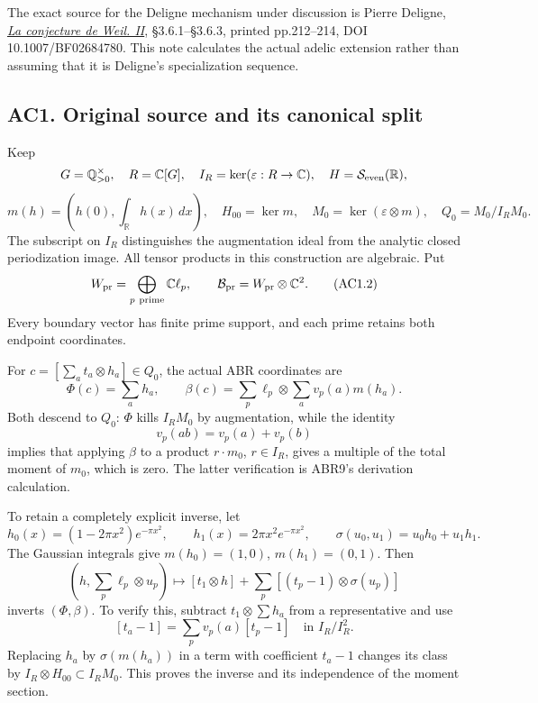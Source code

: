 The exact source for the Deligne mechanism under discussion is Pierre
Deligne,
\href{https://www.numdam.org/item/PMIHES_1980__52__137_0/}{\emph{La
conjecture de Weil. II}}, §3.6.1--§3.6.3, printed pp.212--214, DOI
10.1007/BF02684780. This note calculates the actual adelic extension
rather than assuming that it is Deligne's specialization sequence.

\subsection{AC1. Original source and its canonical
split}\label{ac1.-original-source-and-its-canonical-split}

Keep \[
 G=\mathbb Q_{>0}^{\times},\quad R=\mathbb C[G],\quad
 I_R=\ker(\varepsilon:R\to\mathbb C),\quad
 H=\mathcal S_{\rm even}(\mathbb R),
\] \[
 m(h)=\left(h(0),\int_{\mathbb R}h(x)\,dx\right),\quad
 H_{00}=\ker m,\quad M_0=\ker(\varepsilon\otimes m),
 \quad Q_0=M_0/I_RM_0 .
\tag{AC1.1}
\] The subscript on \(I_R\) distinguishes the augmentation ideal from
the analytic closed periodization image. All tensor products in this
construction are algebraic. Put \[
 W_{\rm pr}=\bigoplus_{p\ {\rm prime}}\mathbb C\ell_p,\qquad
 \mathcal B_{\rm pr}=W_{\rm pr}\otimes\mathbb C^2.
\tag{AC1.2}
\] Every boundary vector has finite prime support, and each prime
retains both endpoint coordinates.

For \(c=[\sum_at_a\otimes h_a]\in Q_0\), the actual ABR coordinates are
\[
 \Phi(c)=\sum_a h_a,\qquad
 \beta(c)=\sum_p\ell_p\otimes\sum_a v_p(a)m(h_a).
\tag{AC1.3}
\] Both descend to \(Q_0\): \(\Phi\) kills \(I_RM_0\) by augmentation,
while the identity \[
 v_p(ab)=v_p(a)+v_p(b)
\] implies that applying \(\beta\) to a product \(r\cdot m_0\),
\(r\in I_R\), gives a multiple of the total moment of \(m_0\), which is
zero. The latter verification is ABR9's derivation calculation.

To retain a completely explicit inverse, let \[
 h_0(x)=(1-2\pi x^2)e^{-\pi x^2},\qquad
 h_1(x)=2\pi x^2e^{-\pi x^2},\qquad
 \sigma(u_0,u_1)=u_0h_0+u_1h_1.
\] The Gaussian integrals give \(m(h_0)=(1,0)\), \(m(h_1)=(0,1)\). Then
\[
 (h,\sum_p\ell_p\otimes u_p)\longmapsto
 [t_1\otimes h]+\sum_p[(t_p-1)\otimes\sigma(u_p)]
\tag{AC1.4}
\] inverts \((\Phi,\beta)\). To verify this, subtract
\(t_1\otimes\sum h_a\) from a representative and use \[
 [t_a-1]=\sum_pv_p(a)[t_p-1]\quad\text{in }I_R/I_R^2.
\] Replacing \(h_a\) by \(\sigma(m(h_a))\) in a term with coefficient
\(t_a-1\) changes its class by \(I_R\otimes H_{00}\subset I_RM_0\). This
proves the inverse and its independence of the moment section.

